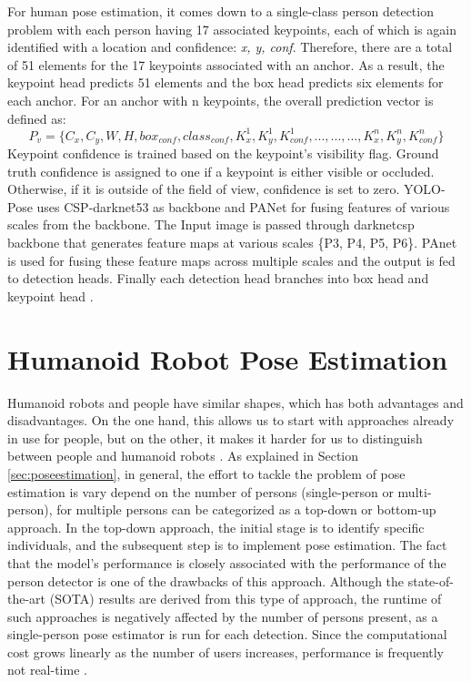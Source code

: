 For human pose estimation, it comes down to a single-class person detection problem with each person having 17 associated keypoints, each of which is again identified with a location and confidence: \emph{{x, y, conf}}.
Therefore, there are a total of 51 elements for the 17 keypoints associated with an anchor. As a result, the keypoint head predicts 51 elements and the box head predicts six elements for each anchor.
For an anchor with n keypoints, the overall prediction vector is defined as:
\begin{equation}
  \label{eq:yoloresult}
  P_v = \bigl\{ C_x, C_y, W, H, box_{conf}, class_{conf}, K_x^1, K_y^1, K_{conf}^1, ..., ..., ..., K_x^n, K_y^n, K_{conf}^n \bigr\}
\end{equation}
Keypoint confidence is trained based on the keypoint's visibility flag. Ground truth confidence is assigned to one if a keypoint is either visible or occluded. Otherwise, if it is outside of the field of view, confidence is set to zero.
YOLO-Pose uses CSP-darknet53 \parencite{wang2020} as backbone and PANet \parencite{liu2018} for fusing features of various scales from the backbone.
The Input image is passed through darknetcsp backbone that generates feature maps at
various scales \{P3, P4, P5, P6\}. PAnet is used for fusing these feature maps across multiple scales and the output is fed to detection
heads. Finally each detection head branches into box head and keypoint head \parencite{maji2022yolopose}.


\section{Humanoid Robot Pose Estimation}
\label{sec:humanoidrobotposeestimation}

Humanoid robots and people have similar shapes, which has both advantages and disadvantages. On the one hand, this allows us to start with approaches already in use for people, but on the other, it makes it harder for us to distinguish between people and humanoid robots \parencite{amini2021}.
As explained in Section \ref{sec:poseestimation}, in general, the effort to tackle the problem of pose estimation is vary depend on the number of persons (single-person or multi-person), for multiple persons can be categorized as a top-down or bottom-up approach.
In the top-down approach, the initial stage is to identify specific individuals, and the subsequent step is to implement pose estimation. The fact that the model's performance is closely associated with the performance of the person detector is one of the drawbacks of this approach. Although the state-of-the-art (SOTA) results are derived from this type of approach,  the runtime of such approaches is negatively affected by the number of persons present,
as a single-person pose estimator is run for each detection. Since the computational cost grows linearly as the number of users increases, performance is frequently not real-time \parencite{amini2021}.

